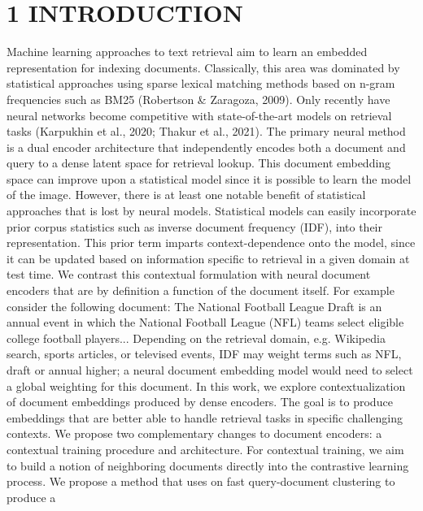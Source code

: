 \section*{1 INTRODUCTION}
Machine learning approaches to text retrieval aim to learn an embedded representation for indexing documents. Classically, this area was dominated by statistical approaches using sparse lexical matching methods based on n-gram frequencies such as BM25 (Robertson \& Zaragoza, 2009). Only recently have neural networks become competitive with state-of-the-art models on retrieval tasks (Karpukhin et al., 2020; Thakur et al., 2021). The primary neural method is a dual encoder architecture that independently encodes both a document and query to a dense latent space for retrieval lookup. This document embedding space can improve upon a statistical model since it is possible to learn the model of the image.
However, there is at least one notable benefit of statistical approaches that is lost by neural models. Statistical models can easily incorporate prior corpus statistics such as inverse document frequency (IDF), into their representation. This prior term imparts context-dependence onto the model, since it can be updated based on information specific to retrieval in a given domain at test time. We contrast this contextual formulation with neural document encoders that are by definition a function of the document itself. For example consider the following document:
The National Football League Draft is an annual event in which the National Football League (NFL) teams select eligible college football players...
Depending on the retrieval domain, e.g. Wikipedia search, sports articles, or televised events, IDF may weight terms such as NFL, draft or annual higher; a neural document embedding model would need to select a global weighting for this document.
In this work, we explore contextualization of document embeddings produced by dense encoders. The goal is to produce embeddings that are better able to handle retrieval tasks in specific challenging contexts. We propose two complementary changes to document encoders: a contextual training procedure and architecture.
For contextual training, we aim to build a notion of neighboring documents directly into the contrastive learning process. We propose a method that uses on fast query-document clustering to produce a

